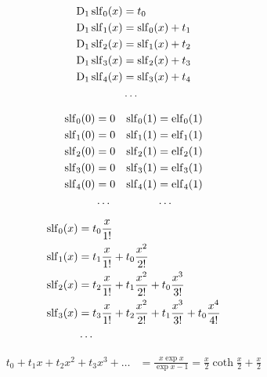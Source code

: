 \begin{equation*} \begin{aligned}
\mathrm{D}_1 \operatorname{slf}_0(x) &= t_0  
\\
\mathrm{D}_1 \operatorname{slf}_1(x) &= \operatorname{slf}_0(x) + t_1  
\\
\mathrm{D}_1 \operatorname{slf}_2(x) &= \operatorname{slf}_1(x) + t_2  
\\
\mathrm{D}_1 \operatorname{slf}_3(x) &= \operatorname{slf}_2(x) + t_3 
\\
\mathrm{D}_1 \operatorname{slf}_4(x) &= \operatorname{slf}_3(x) + t_4 
\\
&\ldots
\\
\end{aligned} \end{equation*}

\begin{equation*} \begin{aligned}
\operatorname{slf}_0(0) &= 0 & \operatorname{slf}_0(1) &= \operatorname{elf}_0(1)
\\
\operatorname{slf}_1(0) &= 0 & \operatorname{slf}_1(1) &= \operatorname{elf}_1(1)
\\
\operatorname{slf}_2(0) &= 0 & \operatorname{slf}_2(1) &= \operatorname{elf}_2(1)
\\
\operatorname{slf}_3(0) &= 0 & \operatorname{slf}_3(1) &= \operatorname{elf}_3(1)
\\
\operatorname{slf}_4(0) &= 0 & \operatorname{slf}_4(1) &= \operatorname{elf}_4(1)
\\
&\ldots & &\ldots
\\
\end{aligned} \end{equation*}

\begin{equation*} \begin{aligned}
\operatorname{slf}_0(x) &= 
  t_0 \frac{x}{1!} 
\\
\operatorname{slf}_1(x) &= 
  t_1 \frac{x}{1!} 
+ t_0 \frac{x^2}{2!} 
\\
\operatorname{slf}_2(x) &= 
  t_2 \frac{x}{1!} 
+ t_1 \frac{x^2}{2!} 
+ t_0 \frac{x^3}{3!} 
\\
\operatorname{slf}_3(x) &= 
  t_3 \frac{x}{1!} 
+ t_2 \frac{x^2}{2!} 
+ t_1 \frac{x^3}{3!} 
+ t_0 \frac{x^4}{4!} 
\\
&\ldots
\\
\end{aligned} \end{equation*}

\begin{equation*} \begin{aligned}
  t_0
+ t_1 x
+ t_2 x^2
+ t_3 x^3
+ \ldots
&
= \frac{x \exp{x}}{\exp{x} - 1}
= \frac{x}{2} \coth{\frac{x}{2}} 
+ \frac{x}{2}
\\
\end{aligned} \end{equation*}

